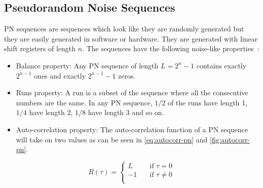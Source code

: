 
\subsection{Pseudorandom Noise Sequences}
\label{subsec:pn-sequences}

PN sequences are sequences which look like they are randomly generated but they are easily generated in software or hardware.
They are generated with linear shift registers of length $n$.
The sequences have the following noise-like properties~\cite{mitra2008pseudo}:

\begin{itemize}
	\item Balance property:	Any PN sequence of length $L = 2^n - 1$ contains exactly $2^{n-1}$ ones and exactly $2^{n-1} - 1$ zeros.

	\item Runs property: A run is a subset of the sequence where all the consecutive numbers are the same. In any PN sequence, $1/2$ of the runs have length 1, $1/4$ have length 2, $1/8$ have length 3 and so on.

	\item Auto-correlation property: The auto-correlation function of a PN sequence will take on two values as can be seen in \autoref{eq:autocorr-pn} and \autoref{fig:autocorr-pn}.


\end{itemize}






\begin{equation}
	\label{eq:autocorr-pn}
	R(\tau) = 
		\begin{cases}
			L    & \quad \text{if } \tau = 0 \\
			-1   & \quad \text{if } \tau \neq 0 \\
		\end{cases}
\end{equation}






